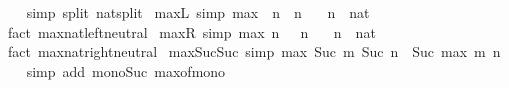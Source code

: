 \begin{isabellebody}
%
\isadelimproof
\ \ %
\endisadelimproof
%
\isatagproof
{}\isamarkupfalse%
\ {\isacharparenleft}{\kern0pt}simp\ split{\isacharcolon}{\kern0pt}\ nat{\isachardot}{\kern0pt}split{\isacharparenright}{\kern0pt}%
\endisatagproof
{\isafoldproof}%
%
\isadelimproof
\isanewline
%
\endisadelimproof
\isanewline
{}\isamarkupfalse%
\ max{\isacharunderscore}{\kern0pt}{}L\ {\isacharbrackleft}{\kern0pt}simp{\isacharbrackright}{\kern0pt}{\isacharcolon}{\kern0pt}\ {\isachardoublequoteopen}max\ {}\ n\ {\isacharequal}{\kern0pt}\ n{\isachardoublequoteclose}\isanewline
\ \ \ n\ {\isacharcolon}{\kern0pt}{\isacharcolon}{\kern0pt}\ nat\isanewline
%
\isadelimproof
\ \ %
\endisadelimproof
%
\isatagproof
{}\isamarkupfalse%
\ {\isacharparenleft}{\kern0pt}fact\ max{\isacharunderscore}{\kern0pt}nat{\isachardot}{\kern0pt}left{\isacharunderscore}{\kern0pt}neutral{\isacharparenright}{\kern0pt}%
\endisatagproof
{\isafoldproof}%
%
\isadelimproof
\isanewline
%
\endisadelimproof
\isanewline
{}\isamarkupfalse%
\ max{\isacharunderscore}{\kern0pt}{}R\ {\isacharbrackleft}{\kern0pt}simp{\isacharbrackright}{\kern0pt}{\isacharcolon}{\kern0pt}\ {\isachardoublequoteopen}max\ n\ {}\ {\isacharequal}{\kern0pt}\ n{\isachardoublequoteclose}\isanewline
\ \ \ n\ {\isacharcolon}{\kern0pt}{\isacharcolon}{\kern0pt}\ nat\isanewline
%
\isadelimproof
\ \ %
\endisadelimproof
%
\isatagproof
{}\isamarkupfalse%
\ {\isacharparenleft}{\kern0pt}fact\ max{\isacharunderscore}{\kern0pt}nat{\isachardot}{\kern0pt}right{\isacharunderscore}{\kern0pt}neutral{\isacharparenright}{\kern0pt}%
\endisatagproof
{\isafoldproof}%
%
\isadelimproof
\isanewline
%
\endisadelimproof
\isanewline
{}\isamarkupfalse%
\ max{\isacharunderscore}{\kern0pt}Suc{\isacharunderscore}{\kern0pt}Suc\ {\isacharbrackleft}{\kern0pt}simp{\isacharbrackright}{\kern0pt}{\isacharcolon}{\kern0pt}\ {\isachardoublequoteopen}max\ {\isacharparenleft}{\kern0pt}Suc\ m{\isacharparenright}{\kern0pt}\ {\isacharparenleft}{\kern0pt}Suc\ n{\isacharparenright}{\kern0pt}\ {\isacharequal}{\kern0pt}\ Suc\ {\isacharparenleft}{\kern0pt}max\ m\ n{\isacharparenright}{\kern0pt}{\isachardoublequoteclose}\isanewline
%
\isadelimproof
\ \ %
\endisadelimproof
%
\isatagproof
{}\isamarkupfalse%
\ {\isacharparenleft}{\kern0pt}simp\ add{\isacharcolon}{\kern0pt}\ mono{\isacharunderscore}{\kern0pt}Suc\ max{\isacharunderscore}{\kern0pt}of{\isacharunderscore}{\kern0pt}mono{\isacharparenright}{\kern0pt}%
\endisatagproof
{\isafoldproof}%

\end{isabellebody}
